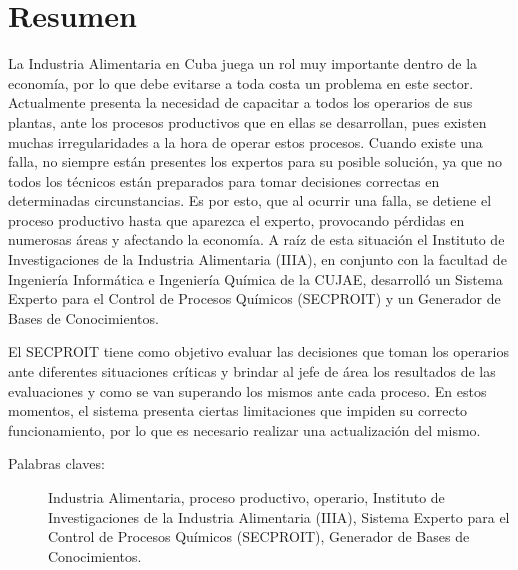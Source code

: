 \section*{Resumen}
La Industria Alimentaria en Cuba juega un rol muy importante dentro de la economía, por lo que debe evitarse a toda costa un problema en este sector. Actualmente presenta la necesidad de capacitar a todos los operarios de sus plantas, ante los procesos productivos que en ellas se desarrollan, pues existen muchas irregularidades a la hora de operar estos procesos. Cuando existe una falla, no siempre están presentes los expertos para su posible solución, ya que no todos los técnicos están preparados para tomar decisiones correctas en determinadas circunstancias. Es por esto, que al ocurrir una falla, se detiene el proceso productivo hasta que aparezca el experto, provocando pérdidas en numerosas áreas y afectando la economía.
A raíz de esta situación el Instituto de Investigaciones de la Industria Alimentaria (IIIA), en conjunto con la facultad de Ingeniería Informática e Ingeniería Química de la CUJAE, desarrolló un Sistema Experto para el Control de Procesos Químicos (SECPROIT) y un Generador de Bases de Conocimientos.

El SECPROIT tiene como objetivo evaluar las decisiones que toman los operarios ante diferentes situaciones críticas y brindar al jefe de área los resultados de las evaluaciones y como se van superando los mismos ante cada proceso. En estos momentos, el sistema presenta ciertas limitaciones que impiden su correcto funcionamiento, por lo que es necesario realizar una actualización del mismo.


\begin{description}
	\item[Palabras claves:]{Industria Alimentaria, proceso productivo, operario, Instituto de Investigaciones de la Industria Alimentaria (IIIA), Sistema Experto para el Control de Procesos Químicos (SECPROIT), Generador de Bases de Conocimientos.}
\end{description}



